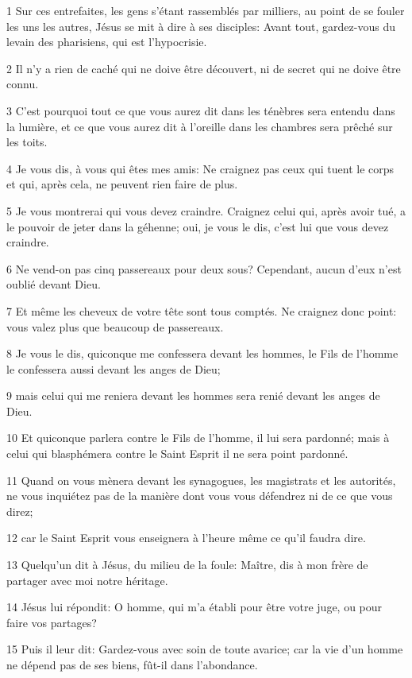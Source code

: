 \par 1 Sur ces entrefaites, les gens s'étant rassemblés par milliers, au point de se fouler les uns les autres, Jésus se mit à dire à ses disciples: Avant tout, gardez-vous du levain des pharisiens, qui est l'hypocrisie.
\par 2 Il n'y a rien de caché qui ne doive être découvert, ni de secret qui ne doive être connu.
\par 3 C'est pourquoi tout ce que vous aurez dit dans les ténèbres sera entendu dans la lumière, et ce que vous aurez dit à l'oreille dans les chambres sera prêché sur les toits.
\par 4 Je vous dis, à vous qui êtes mes amis: Ne craignez pas ceux qui tuent le corps et qui, après cela, ne peuvent rien faire de plus.
\par 5 Je vous montrerai qui vous devez craindre. Craignez celui qui, après avoir tué, a le pouvoir de jeter dans la géhenne; oui, je vous le dis, c'est lui que vous devez craindre.
\par 6 Ne vend-on pas cinq passereaux pour deux sous? Cependant, aucun d'eux n'est oublié devant Dieu.
\par 7 Et même les cheveux de votre tête sont tous comptés. Ne craignez donc point: vous valez plus que beaucoup de passereaux.
\par 8 Je vous le dis, quiconque me confessera devant les hommes, le Fils de l'homme le confessera aussi devant les anges de Dieu;
\par 9 mais celui qui me reniera devant les hommes sera renié devant les anges de Dieu.
\par 10 Et quiconque parlera contre le Fils de l'homme, il lui sera pardonné; mais à celui qui blasphémera contre le Saint Esprit il ne sera point pardonné.
\par 11 Quand on vous mènera devant les synagogues, les magistrats et les autorités, ne vous inquiétez pas de la manière dont vous vous défendrez ni de ce que vous direz;
\par 12 car le Saint Esprit vous enseignera à l'heure même ce qu'il faudra dire.
\par 13 Quelqu'un dit à Jésus, du milieu de la foule: Maître, dis à mon frère de partager avec moi notre héritage.
\par 14 Jésus lui répondit: O homme, qui m'a établi pour être votre juge, ou pour faire vos partages?
\par 15 Puis il leur dit: Gardez-vous avec soin de toute avarice; car la vie d'un homme ne dépend pas de ses biens, fût-il dans l'abondance.

